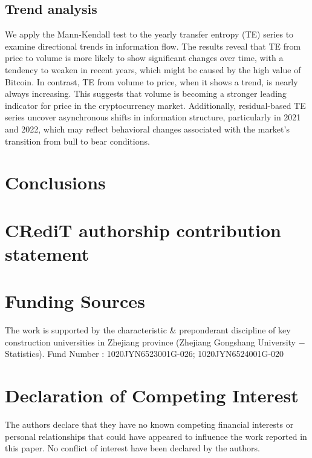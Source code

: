 \documentclass{elsarticle}
\begin{document}
\subsection{Trend analysis}
We apply the Mann-Kendall test to the yearly transfer entropy (TE) series to examine directional trends in information flow. The results reveal that TE from price to volume is more likely to show significant changes over time, with a tendency to weaken in recent years, which might be caused by the high value of Bitcoin. In contrast, TE from volume to price, when it shows a trend, is nearly always increasing. This suggests that volume is becoming a stronger leading indicator for price in the cryptocurrency market. Additionally, residual-based TE series uncover asynchronous shifts in information structure, particularly in 2021 and 2022, which may reflect behavioral changes associated with the market's transition from bull to bear conditions.






\section{Conclusions}

\section*{CRediT authorship contribution statement}



\section*{Funding Sources}
The work is supported by the characteristic \& preponderant discipline of key construction universities in Zhejiang province (Zhejiang Gongshang University $-$ Statistics). Fund Number : 1020JYN6523001G-026; 1020JYN6524001G-020



\section*{Declaration of Competing Interest}
The authors declare that they have no known competing financial interests or personal relationships that could have appeared to influence the work reported in this paper. No conflict of interest have been declared by the authors.




\end{document}
